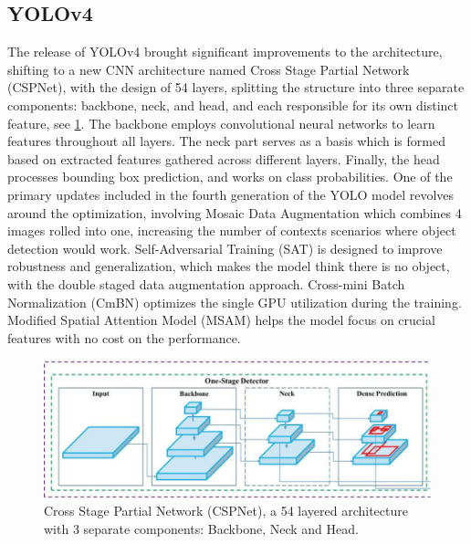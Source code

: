 \begin{multicols}{2}
\subsection{YOLOv4}
The release of YOLOv4 brought significant improvements to the architecture, shifting to a new CNN architecture named Cross Stage Partial Network (CSPNet), with the design of 54 layers, splitting the structure into three separate components: backbone, neck, and head, and each responsible for its own distinct feature, see \ref{fig:CSPNet}. The backbone employs convolutional neural networks to learn features throughout all layers. The neck part serves as a basis which is formed based on extracted features gathered across different layers. Finally, the head processes bounding box prediction, and works on class probabilities. One of the primary updates included in the fourth generation of the YOLO model revolves around the optimization, involving Mosaic Data Augmentation which combines 4 images rolled into one, increasing the number of contexts scenarios where object detection would work. Self-Adversarial Training (SAT) is designed to improve robustness and generalization, which makes the model think there is no object, with the double staged data augmentation approach. Cross-mini Batch Normalization (CmBN) optimizes the single GPU utilization during the training. Modified Spatial Attention Model (MSAM) helps the model focus on crucial features with no cost on the performance. 
\end{multicols}

\begin{figure}[ht]
    \centering
    \includegraphics[width=1\linewidth]{datas/Cross Stage Partial Network (CSPNet).png}
    \caption{Cross Stage Partial Network (CSPNet), a 54 layered architecture with 3 separate components: Backbone, Neck and Head.}
    \label{fig:CSPNet}
\end{figure}
 
